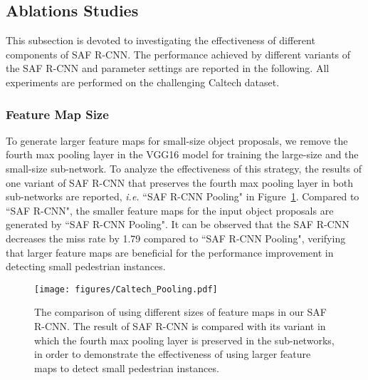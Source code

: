 \documentclass[journal]{IEEEtran}
\begin{document}
\subsection{Ablations Studies}
This subsection is devoted to investigating the effectiveness of different components of SAF R-CNN. The performance achieved by different variants of the SAF R-CNN and parameter settings are reported in the following. All experiments are performed on the challenging Caltech dataset.

\subsubsection{Feature Map Size}
To generate larger feature maps for small-size object proposals, we remove the fourth max pooling layer in the VGG16 model for training the large-size and the small-size sub-network. To analyze the effectiveness of this strategy, the results of one variant of SAF R-CNN that preserves the fourth max pooling layer in both sub-networks are reported, \emph{i.e.} ``SAF R-CNN Pooling" in Figure~\ref{fig:Caltech_Pooling}. Compared to ``SAF R-CNN", the smaller feature maps for the input object proposals are generated by ``SAF R-CNN Pooling". It can be observed that the SAF R-CNN decreases the miss rate by 1.79 compared to ``SAF R-CNN Pooling", verifying that larger feature maps are beneficial for the performance improvement in detecting small pedestrian instances. 

\begin{figure}
	\begin{center}
		\texttt{[image: figures/Caltech\_Pooling.pdf]}
		\caption{{The comparison of using different sizes of feature maps in our SAF R-CNN. The result of SAF R-CNN is compared with its variant in which the fourth max pooling layer is preserved in the sub-networks, in order to demonstrate the effectiveness of using larger feature maps to detect small pedestrian instances.}}	
		\label{fig:Caltech_Pooling}
	\end{center}
	\vspace{-4mm}
\end{figure}
\end{document}
